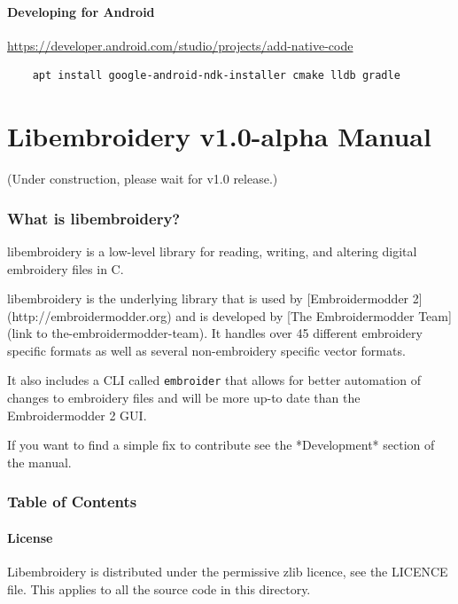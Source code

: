 \documentclass[a4paper, 11pt]{report}
\begin{document}
\subsubsection{Developing for Android}

\url{https://developer.android.com/studio/projects/add-native-code}

\begin{verbatim}
    apt install google-android-ndk-installer cmake lldb gradle
\end{verbatim}

\chapter{Libembroidery v1.0-alpha Manual}

(Under construction, please wait for v1.0 release.)

\subsection{What is libembroidery?}

libembroidery is a low-level library for reading, writing, 
and altering digital embroidery files in C.

libembroidery is the underlying library that is used by [Embroidermodder 2](http://embroidermodder.org)
and is developed by [The Embroidermodder Team](link to the-embroidermodder-team).
It handles over 45 different embroidery specific formats as well
as several non-embroidery specific vector formats.

It also includes a CLI called \texttt{embroider} that allows for better automation of
changes to embroidery files and will be more up-to date than
the Embroidermodder 2 GUI.

If you want to find a simple fix to contribute see the *Development* section
of the manual.


\subsection{Table of Contents}

\subsubsection{ License}

Libembroidery is distributed under the permissive zlib licence, see the 
LICENCE file. This applies to all the source code in this directory.
\end{document}
